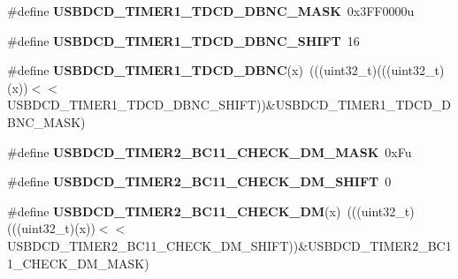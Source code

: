 \begin{DoxyCompactItemize}
\item 
\#define {\bfseries U\+S\+B\+D\+C\+D\+\_\+\+T\+I\+M\+E\+R1\+\_\+\+T\+D\+C\+D\+\_\+\+D\+B\+N\+C\+\_\+\+M\+A\+SK}~0x3\+F\+F0000u\hypertarget{group__USBDCD__Register__Masks_gaa9effc48a7e8a226b8624dc08d85d704}{}\label{group__USBDCD__Register__Masks_gaa9effc48a7e8a226b8624dc08d85d704}

\item 
\#define {\bfseries U\+S\+B\+D\+C\+D\+\_\+\+T\+I\+M\+E\+R1\+\_\+\+T\+D\+C\+D\+\_\+\+D\+B\+N\+C\+\_\+\+S\+H\+I\+FT}~16\hypertarget{group__USBDCD__Register__Masks_ga5c3ffaffcc961857121e8ecf9692c70c}{}\label{group__USBDCD__Register__Masks_ga5c3ffaffcc961857121e8ecf9692c70c}

\item 
\#define {\bfseries U\+S\+B\+D\+C\+D\+\_\+\+T\+I\+M\+E\+R1\+\_\+\+T\+D\+C\+D\+\_\+\+D\+B\+NC}(x)~(((uint32\+\_\+t)(((uint32\+\_\+t)(x))$<$$<$U\+S\+B\+D\+C\+D\+\_\+\+T\+I\+M\+E\+R1\+\_\+\+T\+D\+C\+D\+\_\+\+D\+B\+N\+C\+\_\+\+S\+H\+I\+FT))\&U\+S\+B\+D\+C\+D\+\_\+\+T\+I\+M\+E\+R1\+\_\+\+T\+D\+C\+D\+\_\+\+D\+B\+N\+C\+\_\+\+M\+A\+SK)\hypertarget{group__USBDCD__Register__Masks_ga1aa87b0c873931aac928ad346f49729d}{}\label{group__USBDCD__Register__Masks_ga1aa87b0c873931aac928ad346f49729d}

\item 
\#define {\bfseries U\+S\+B\+D\+C\+D\+\_\+\+T\+I\+M\+E\+R2\+\_\+\+B\+C11\+\_\+\+C\+H\+E\+C\+K\+\_\+\+D\+M\+\_\+\+M\+A\+SK}~0x\+Fu\hypertarget{group__USBDCD__Register__Masks_ga0b011ea67418c2cb8e3a45f396fd8819}{}\label{group__USBDCD__Register__Masks_ga0b011ea67418c2cb8e3a45f396fd8819}

\item 
\#define {\bfseries U\+S\+B\+D\+C\+D\+\_\+\+T\+I\+M\+E\+R2\+\_\+\+B\+C11\+\_\+\+C\+H\+E\+C\+K\+\_\+\+D\+M\+\_\+\+S\+H\+I\+FT}~0\hypertarget{group__USBDCD__Register__Masks_gaa0b16aa7f0c9f3713c738c0d63b3d647}{}\label{group__USBDCD__Register__Masks_gaa0b16aa7f0c9f3713c738c0d63b3d647}

\item 
\#define {\bfseries U\+S\+B\+D\+C\+D\+\_\+\+T\+I\+M\+E\+R2\+\_\+\+B\+C11\+\_\+\+C\+H\+E\+C\+K\+\_\+\+DM}(x)~(((uint32\+\_\+t)(((uint32\+\_\+t)(x))$<$$<$U\+S\+B\+D\+C\+D\+\_\+\+T\+I\+M\+E\+R2\+\_\+\+B\+C11\+\_\+\+C\+H\+E\+C\+K\+\_\+\+D\+M\+\_\+\+S\+H\+I\+FT))\&U\+S\+B\+D\+C\+D\+\_\+\+T\+I\+M\+E\+R2\+\_\+\+B\+C11\+\_\+\+C\+H\+E\+C\+K\+\_\+\+D\+M\+\_\+\+M\+A\+SK)\hypertarget{group__USBDCD__Register__Masks_ga934bb0d81810c5aa1deebbe47fe86d4d}{}\label{group__USBDCD__Register__Masks_ga934bb0d81810c5aa1deebbe47fe86d4d}


\end{DoxyCompactItemize}
